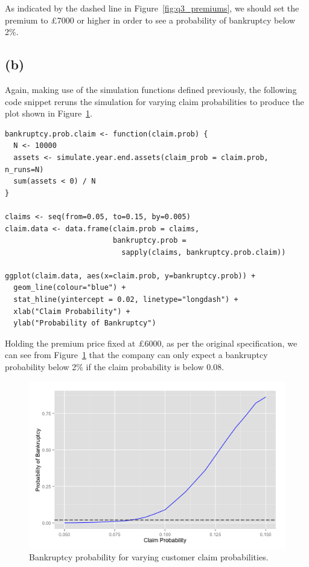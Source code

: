 \documentclass{article}
\begin{document}
As indicated by the dashed line in Figure~\ref{fig:q3_premiums}, we
should set the premium to \pounds{7000} or higher in order to see a probability
of bankruptcy below 2\%.

\subsection*{(b)}

Again, making use of the simulation functions defined previously, the
following code snippet reruns the simulation for varying claim
probabilities to produce the plot shown in Figure~\ref{fig:q3_claims}.

\begin{verbatim}
bankruptcy.prob.claim <- function(claim.prob) {
  N <- 10000
  assets <- simulate.year.end.assets(claim_prob = claim.prob, n_runs=N)
  sum(assets < 0) / N
}

claims <- seq(from=0.05, to=0.15, by=0.005)
claim.data <- data.frame(claim.prob = claims,
                         bankruptcy.prob =
                           sapply(claims, bankruptcy.prob.claim))

ggplot(claim.data, aes(x=claim.prob, y=bankruptcy.prob)) +
  geom_line(colour="blue") +
  stat_hline(yintercept = 0.02, linetype="longdash") +
  xlab("Claim Probability") +
  ylab("Probability of Bankruptcy")
\end{verbatim}

Holding the premium price fixed at \pounds{6000}, as per the original
specification, we can see from Figure~\ref{fig:q3_claims} that the
company can only expect a bankruptcy probability below 2\% if the
claim probability is below 0.08.

\begin{figure}
  \includegraphics[width=\textwidth]{q3_claims}
  \caption{Bankruptcy probability for varying customer claim
    probabilities.}
  \centering
\label{fig:q3_claims}
\end{figure}
\end{document}
